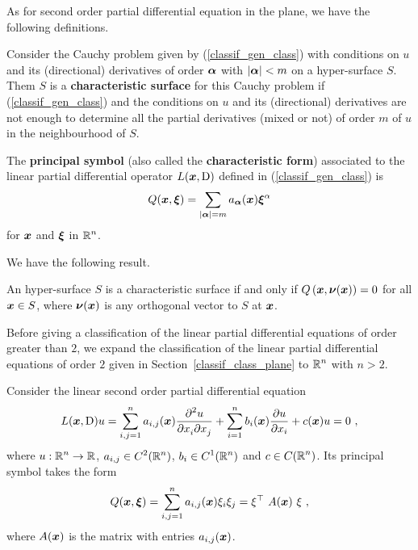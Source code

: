As for second order partial differential equation in the plane, we
have the following definitions.

\begin{defn} \label{char_surf_hd_def}
Consider the Cauchy problem given by (\ref{classif_gen_class}) with
conditions on $u$ and its (directional) derivatives of order $\VEC{\alpha}$
with $|\VEC{\alpha}|<m$ on a hyper-surface $S$.  Them $S$ is a
{\bfseries characteristic surface}
for this Cauchy problem if (\ref{classif_gen_class}) and the
conditions on $u$ and its (directional) derivatives are not
enough to determine all the partial derivatives (mixed or not) of
order $m$ of $u$ in the neighbourhood of $S$.
\end{defn}

\begin{defn}
The {\bfseries principal symbol} (also called the
{\bfseries characteristic form})
associated to the linear partial differential operator
$\displaystyle L(\VEC{x}, \diff)$ defined in
(\ref{classif_gen_class}) is
\begin{equation} \label{classif_gen_princ_symb}
Q(\VEC{x}, \VEC{\xi}) = \sum_{|\VEC{\alpha}|=m}
a_{\VEC{\alpha}}(\VEC{x}) \VEC{\xi}^\alpha
\end{equation}
for $\VEC{x}$ and $\VEC{\xi}$ in $\displaystyle \RR^n$.
\end{defn}

We have the following result.

\begin{prop}
An hyper-surface $S$ is a characteristic surface if and only if
$\displaystyle Q\left(\VEC{x}, \VEC{\nu}(\VEC{x}) \right) = 0$ for all
$\VEC{x} \in S$,
where $\displaystyle \VEC{\nu}(\VEC{x})$ is any orthogonal vector to $S$
at $\VEC{x}$.
\end{prop}

Before giving a classification of the linear partial differential
equations of order greater than $2$, we expand the classification of
the linear partial differential equations of order 
$2$ given in Section~\ref{classif_class_plane} to
$\displaystyle \RR^n$ with $n>2$.

Consider the linear second order partial differential equation
\begin{equation} \label{classif_class_n}
L(\VEC{x}, \diff)u = \sum_{i,j=1}^n a_{i,j}(\VEC{x})
\pdydxnm{u}{x_i}{x_j}{2}{}{} + \sum_{i=1}^n b_i(\VEC{x})
\pdydx{u}{x_i} + c(\VEC{x})u = 0 \ ,
\end{equation}
where $\displaystyle u:\RR^n \rightarrow \RR$,
$\displaystyle a_{i,j} \in C^2(\RR^n)$,
$\displaystyle b_i \in C^1(\RR^n)$ and $\displaystyle c \in C(\RR^n)$.
Its principal symbol takes the form
\begin{equation} \label{classif_princ_symb_n}
Q(\VEC{x}, \VEC{\xi}) = \sum_{i,j=1}^n a_{i,j}(\VEC{x})\xi_i \xi_j
= \xi^\top\ A(\VEC{x})\ \xi \ ,
\end{equation}
where $A(\VEC{x})$ is the \nn matrix with entries $a_{i,j}(\VEC{x})$.

